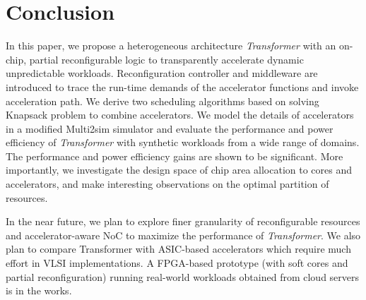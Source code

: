 \section{Conclusion}
\label{sec_concl}

In this paper, we propose a heterogeneous architecture {\em
  Transformer} with an on-chip, partial reconfigurable logic to
transparently accelerate dynamic unpredictable workloads.
Reconfiguration controller and middleware are introduced to trace the
run-time demands of the accelerator functions and invoke acceleration
path. We derive two scheduling algorithms based on solving Knapsack
problem to combine accelerators. We model the details of
accelerators in a modified Multi2sim simulator and evaluate the
performance and power efficiency of {\em Transformer} with synthetic
workloads from a wide range of domains. The performance and power
efficiency gains are shown to be significant. More importantly, we
investigate the design space of chip area allocation to cores and
accelerators, and make interesting observations on the optimal partition
of resources. 

In the near future, we plan to explore finer granularity
of reconfigurable resources and accelerator-aware NoC to maximize the
performance of {\em Transformer}. We also plan to compare Transformer
with ASIC-based accelerators which require much effort in VLSI
implementations. A FPGA-based prototype (with soft cores and partial
reconfiguration) running real-world workloads obtained from cloud
servers is in the works.

